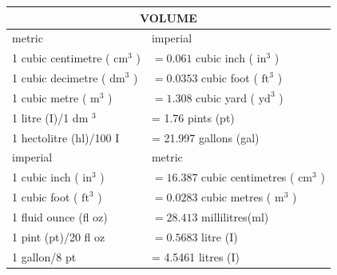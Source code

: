 \documentclass[10pt]{article}
\begin{document}
\begin{center}
\begin{tabular}{|l|l|}
\hline
\multicolumn{2}{|c|}{VOLUME} \\
\hline
metric & imperial \\
\hline
1 cubic centimetre ( $\mathrm{cm}^{3}$ ) & $=0.061$ cubic inch ( $\mathrm{in}^{3}$ ) \\
\hline
1 cubic decimetre ( $\mathrm{dm}^{3}$ ) & $=0.0353$ cubic foot ( $\mathrm{ft}^{3}$ ) \\
\hline
1 cubic metre ( $\mathrm{m}^{3}$ ) & $=1.308$ cubic yard ( $\mathrm{yd}^{3}$ ) \\
\hline
1 litre (I)/1 dm ${ }^{3}$ & = 1.76 pints (pt) \\
\hline
1 hectolitre (hl)/100 I & = 21.997 gallons (gal) \\
\hline
imperial & metric \\
\hline
1 cubic inch ( $\mathrm{in}^{3}$ ) & $=16.387$ cubic centimetres ( $\mathrm{cm}^{3}$ ) \\
\hline
1 cubic foot ( $\mathrm{ft}^{3}$ ) & $=0.0283$ cubic metres ( $\mathrm{m}^{3}$ ) \\
\hline
1 fluid ounce (fl oz) & $=28.413$ millilitres(ml) \\
\hline
1 pint (pt)/20 fl oz & $=0.5683$ litre (I) \\
\hline
1 gallon/8 pt & = 4.5461 litres (I) \\
\hline
\end{tabular}
\end{center}
\end{document}
